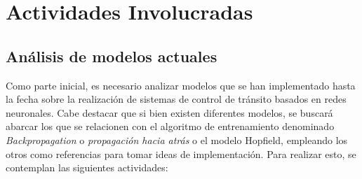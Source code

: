 \section{Actividades Involucradas}

\subsection{An\'{a}lisis de modelos actuales}


	Como parte inicial, es necesario analizar modelos que se han implementado
hasta la fecha sobre la realizaci\'{o}n de sistemas de control de tr\'{a}nsito
basados en redes neuronales. Cabe destacar que si bien existen diferentes
modelos,  se buscar\'{a} abarcar los que se
relacionen con el algoritmo de entrenamiento denominado \textit{Backpropagation} o \textit{propagaci\'{o}n
hacia atr\'{a}s} o el modelo Hopfield, empleando los otros como referencias
para tomar ideas de implementaci\'{o}n. Para realizar esto, se contemplan las
siguientes actividades:

